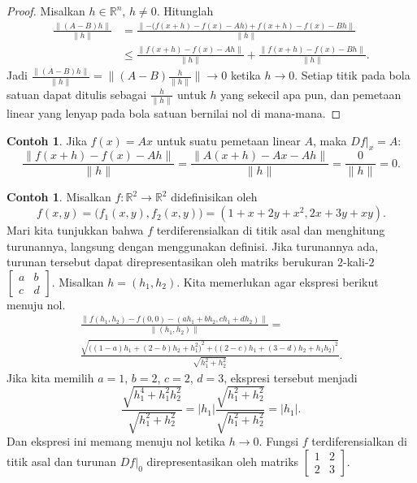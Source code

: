 \documentclass[12pt,openany]{book}
\newcommand{\sabs}[1]{\lvert {#1} \rvert}
\newcommand{\snorm}[1]{\lVert {#1} \rVert}
\newcommand{\bnorm}[1]{\bigl\lVert {#1} \bigr\rVert}
\newcommand{\R}{{\mathbb{R}}}
\theoremstyle{plain}
\theoremstyle{remark}
\theoremstyle{definition}
\theoremstyle{exercise}
\theoremstyle{example}
\newtheorem{example}[thm]{Contoh}
\begin{document}
\begin{proof}
Misalkan $h \in \R^n$, $h \neq 0$.  Hitunglah
\begin{equation*}
\begin{split}
\frac{\snorm{(A-B)h}}{\snorm{h}} & =
\frac{\snorm{-\bigl( f(x+h)-f(x) - Ah \bigr) + f(x+h)-f(x) - Bh}}{\snorm{h}} \\
& \leq
\frac{\snorm{f(x+h)-f(x) - Ah}}{\snorm{h}} + \frac{\snorm{f(x+h)-f(x) -
Bh}}{\snorm{h}} .
\end{split}
\end{equation*}
Jadi
$\frac{\snorm{(A-B)h}}{\snorm{h}} = \bnorm{(A-B)\frac{h}{\snorm{h}}} \to 0$
ketika $h \to 0$.  Setiap titik pada bola satuan dapat ditulis sebagai $\frac{h}{\snorm{h}}$
untuk $h$ yang sekecil apa pun, dan pemetaan linear yang lenyap pada bola satuan
bernilai nol di mana-mana.
\end{proof}

\begin{example}
Jika $f(x) = Ax$ untuk suatu pemetaan linear $A$, maka
$Df|_x = A$:
\begin{equation*}
\frac{\snorm{f(x+h)-f(x) - Ah}}{\snorm{h}}
=
\frac{\snorm{A(x+h)-Ax - Ah}}{\snorm{h}}
=
\frac{0}{\snorm{h}} = 0 .
\end{equation*}
\end{example}

\begin{example}
Misalkan $f \colon \R^2 \to \R^2$ didefinisikan oleh
\begin{equation*}
f(x,y) = \bigl(f_1(x,y),f_2(x,y)\bigr) = (1+x+2y+x^2,2x+3y+xy).
\end{equation*}
Mari kita tunjukkan bahwa $f$ terdiferensialkan di titik asal dan
menghitung turunannya,
langsung dengan menggunakan definisi.  Jika
turunannya ada, turunan tersebut dapat
direpresentasikan oleh matriks berukuran $2$-kali-$2$
$\left[\begin{smallmatrix}a&b\\c&d\end{smallmatrix}\right]$.  Misalkan $h =
(h_1,h_2)$.  Kita memerlukan agar ekspresi berikut menuju nol.
\begin{multline*}
\frac{\snorm{
f(h_1,h_2)-f(0,0)
-
(ah_1 +bh_2 , ch_1+dh_2)}
}{\snorm{(h_1,h_2)}}
=
\\
\frac{\sqrt{
{\bigl((1-a)h_1 + (2-b)h_2 + h_1^2\bigr)}^2
+
{\bigl((2-c)h_1 + (3-d)h_2 + h_1h_2\bigr)}^2}}{\sqrt{h_1^2+h_2^2}} .
\end{multline*}
Jika kita memilih $a=1$, $b=2$, $c=2$, $d=3$, ekspresi tersebut menjadi
\begin{equation*}
\frac{\sqrt{
h_1^4 + h_1^2h_2^2}}{\sqrt{h_1^2+h_2^2}}
=
\sabs{h_1}
\frac{\sqrt{
h_1^2 + h_2^2}}{\sqrt{h_1^2+h_2^2}}
= \sabs{h_1} .
\end{equation*}
Dan ekspresi ini memang menuju nol ketika $h \to 0$.  Fungsi
$f$ terdiferensialkan di titik asal dan
turunan $Df|_0$ direpresentasikan oleh matriks
$\left[\begin{smallmatrix}1&2\\2&3\end{smallmatrix}\right]$.
\end{example}
\end{document}
